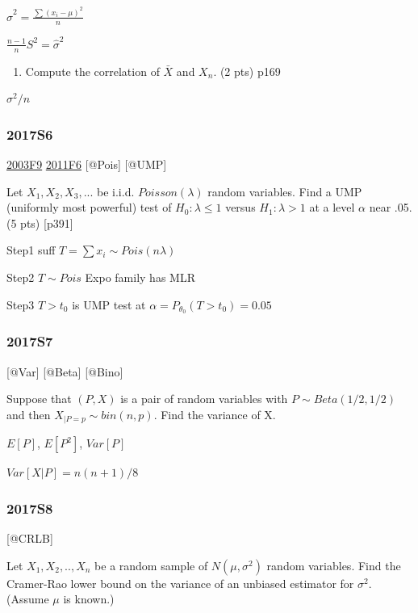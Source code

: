 \documentclass[6pt,Portrait]{article}
\providecommand{\tightlist}{%
  \setlength{\itemsep}{0pt}\setlength{\parskip}{0pt}}
\begin{document}
\(\hat\sigma^2=\frac{\sum(x_i-\mu)^2}{n}\)

\(\frac{n-1}{n}S^2=\hat\sigma^2\)

\begin{enumerate}
\def\labelenumi{(\alph{enumi})}
\setcounter{enumi}{1}
\tightlist
\item
  Compute the correlation of \(\bar X\) and \(X_n\). (2 pts) p169
\end{enumerate}

\(\sigma^2/n\)

\hypertarget{s6-4}{%
\subsubsection{2017S6}\label{s6-4}}

\protect\hyperlink{f9-1}{2003F9} \protect\hyperlink{f6-4}{2011F6}
{[}@Pois{]} {[}@UMP{]}

Let \(X_1,X_2,X_3,...\) be i.i.d. \(Poisson(\lambda)\) random variables.
Find a UMP (uniformly most powerful) test of \(H_0:\lambda\le1\) versus
\(H_1:\lambda>1\) at a level \(\alpha\) near .05. (5 pts) {[}p391{]}

Step1 suff \(T=\sum x_i\sim Pois(n\lambda)\)

Step2 \(T\sim Pois\) Expo family has MLR

Step3 \(T>t_0\) is UMP test at \(\alpha=P_{\theta_0}(T>t_0)=0.05\)

\hypertarget{s7-3}{%
\subsubsection{2017S7}\label{s7-3}}

{[}@Var{]} {[}@Beta{]} {[}@Bino{]}

Suppose that \((P,X)\) is a pair of random variables with
\(P\sim Beta(1/2, 1/2)\) and then \(X_{|P=p}\sim bin(n,p)\). Find the
variance of X.

\(E[P]\), \(E[P^2]\), \(Var[P]\)

\(Var[X|P]=n(n+1)/8\)

\hypertarget{s8-3}{%
\subsubsection{2017S8}\label{s8-3}}

{[}@CRLB{]}

Let \(X_1,X_2,..,X_n\) be a random sample of \(N(\mu,\sigma^2)\) random
variables. Find the Cramer-Rao lower bound on the variance of an
unbiased estimator for \(\sigma^2\). (Assume \(\mu\) is known.)
\end{document}
